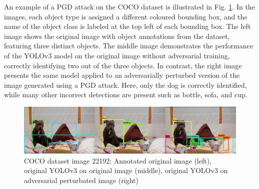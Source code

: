\documentclass[journal,onecolumn,12pt]{IEEEtran}
\begin{document}
An example of a PGD attack on the COCO dataset is illustrated in Fig. \ref{fig:dog1}. In the images, each object type is assigned a different coloured bounding box, and the name of the object class is labeled at the top left of each bounding box. The left image shows the original image with object annotations from the dataset, featuring three distinct objects. The middle image demonstrates the performance of the YOLOv3 model on the original image without adversarial training, correctly identifying two out of the three objects. In contrast, the right image presents the same model applied to an adversarially perturbed version of the image generated using a PGD attack. Here, only the dog is correctly identified, while many other incorrect detections are present such as bottle, sofa, and cup. 


\begin{figure}
    \centering
    \captionsetup{justification=centering}
    \includegraphics[width=1.0\linewidth]{figures/dog1.jpg}
    \caption{COCO dataset image 22192: Annotated original image (left), original YOLOv3 on original image (middle), original YOLOv3 on adversarial perturbated image (right) }
    \label{fig:dog1}
\end{figure}
\end{document}
